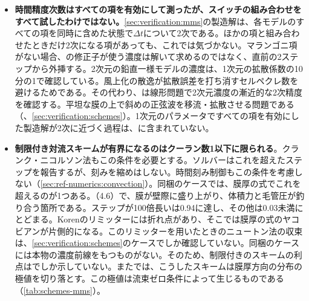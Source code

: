 \begin{itemize}
  \item \textbf{時間精度次数はすべての項を有効にして測ったが、スイッチの組み合わせをすべて試したわけではない。}\cref{sec:verification:mms}の製造解は、各モデルのすべての項を同時に含めた状態で$\Delta t$について2次である。ほかの項と組み合わせたときだけ2次になる項があっても、これでは気づかない。マランゴニ項がない場合、の修正子が使う濃度は解いて求めるのではなく、直前の2ステップから外挿する。2次元の鉛直一様モデルの濃度は、1次元の拡散係数の10分の1で確認している。風上化の散逸が拡散誤差を打ち消すセルペクレ数を避けるためである。その代わり、は線形問題で2次元濃度の漸近的な2次精度を確認する。平坦な膜の上で斜めの正弦波を移流・拡散させる問題である（、\cref{sec:verification:schemes}）。1次元のパラメータですべての項を有効にした製造解が2次に近づく過程は、に含まれていない。
  \item \textbf{制限付き対流スキームが有界になるのはクーラン数1以下に限られる}。クランク・ニコルソン法もこの条件を必要とする。ソルバーはこれを超えたステップを報告するが、刻みを縮めはしない。時間刻み制御もこの条件を考慮しない（\cref{sec:ref-numerics:convection}）。同梱のケースでは、膜厚の式でこれを超えるのが1つある。（4.6）で、膜が壁際に盛り上がり、体積力と毛管圧が釣り合う箇所である。ステップが100倍長いは0.94に達し、その他は0.03未満にとどまる。Korenのリミッターには折れ点があり、そこでは膜厚の式のヤコビアンが片側的になる。このリミッターを用いたときのニュートン法の収束は、\cref{sec:verification:schemes}のケースでしか確認していない。同梱のケースには本物の濃度前線をもつものがない。そのため、制限付きのスキームの利点はでしか示していない。またでは、こうしたスキームは膜厚方向の分布の極値を切り落とす。この極値は流束ゼロ条件によって生じるものである（\cref{tab:schemes-mms}）。

\end{itemize}

